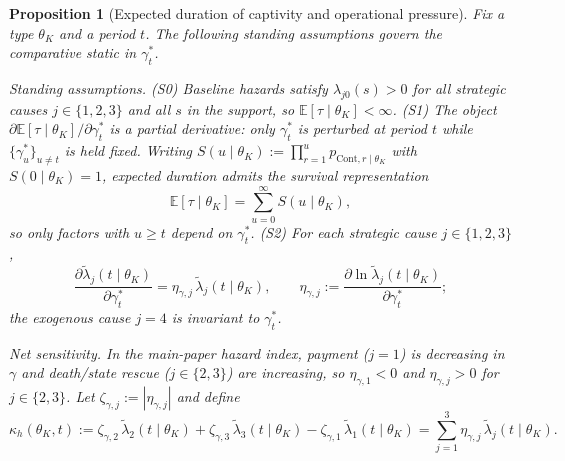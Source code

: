 \documentclass[12pt]{article}
\numberwithin{equation}{section}
\numberwithin{table}{section}
\newtheorem{proposition}[theorem]{Proposition}
\theoremstyle{definition}
\begin{document}

\begin{proposition}[Expected duration of captivity and operational pressure]
\label{prop:expected-captivity-gamma}
Fix a type $\theta_K$ and a period $t$. The following standing assumptions
govern the comparative static in $\gamma_t^\ast$.

\medskip
\noindent\textit{Standing assumptions.}
\textup{(S0)} Baseline hazards satisfy $\lambda_{j0}(s)>0$ for all strategic
causes $j\in\{1,2,3\}$ and all $s$ in the support, so
$\mathbb{E}[\tau\mid\theta_K]<\infty$.
\textup{(S1)} The object $\partial\mathbb{E}[\tau\mid\theta_K]/\partial\gamma_t^\ast$
is a partial derivative: only $\gamma_t^\ast$ is perturbed at period $t$ while
$\{\gamma_u^\ast\}_{u\neq t}$ is held fixed. Writing
$S(u\mid\theta_K):=\prod_{r=1}^{u}p_{\mathrm{Cont},r\mid\theta_K}$ with
$S(0\mid\theta_K)=1$, expected duration admits the survival representation
\begin{equation}
\label{eq:duracion-identidad-prop}
\mathbb{E}[\tau\mid\theta_K]=\sum_{u=0}^{\infty}S(u\mid\theta_K),
\end{equation}
so only factors with $u\ge t$ depend on $\gamma_t^\ast$.
\textup{(S2)} For each strategic cause $j\in\{1,2,3\}$,
\[
\frac{\partial\tilde\lambda_j(t\mid\theta_K)}{\partial\gamma_t^\ast}
=\eta_{\gamma,j}\,\tilde\lambda_j(t\mid\theta_K),
\qquad
\eta_{\gamma,j}:=\frac{\partial\ln\tilde\lambda_j(t\mid\theta_K)}{\partial\gamma_t^\ast};
\]
the exogenous cause $j=4$ is invariant to $\gamma_t^\ast$.

\medskip
\noindent\textit{Net sensitivity.}
In the main-paper hazard index, payment ($j=1$) is decreasing in $\gamma$ and
death/state rescue ($j\in\{2,3\}$) are increasing, so $\eta_{\gamma,1}<0$ and
$\eta_{\gamma,j}>0$ for $j\in\{2,3\}$. Let $\zeta_{\gamma,j}:=|\eta_{\gamma,j}|$
and define
\begin{equation}
\label{eq:kappa-c}
\kappa_h(\theta_K,t)
:=\zeta_{\gamma,2}\,\tilde\lambda_2(t\mid\theta_K)
 +\zeta_{\gamma,3}\,\tilde\lambda_3(t\mid\theta_K)
 -\zeta_{\gamma,1}\,\tilde\lambda_1(t\mid\theta_K)
=\sum_{j=1}^{3}\eta_{\gamma,j}\,\tilde\lambda_j(t\mid\theta_K).
\end{equation}


\end{proposition}
\end{document}
